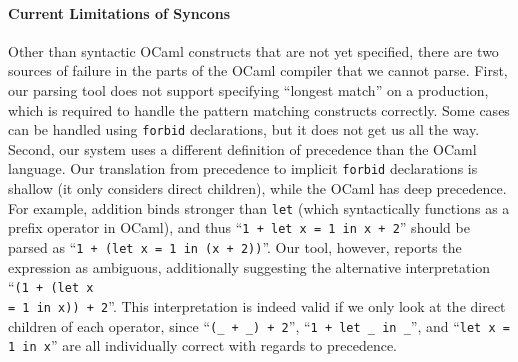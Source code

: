 \documentclass[runningheads]{llncs}
\newcommand{\ocaml}{\lstinline[language={[objective]caml}]}
\newcommand{\syncon}{\lstinline[language=syncon]}
\begin{document}
\paragraph{Current Limitations of Syncons}
%
Other than syntactic OCaml constructs that are not yet specified,
there are two sources of failure in the parts of the OCaml
compiler that we cannot parse.
%
First, our parsing tool does not support specifying ``longest
match'' on a production, which is required to handle the pattern
matching constructs correctly. Some cases can be handled using
\syncon{forbid} declarations, but it does not get us all the way.
%
Second, our system uses a different definition of precedence than
the OCaml language. Our translation from precedence to implicit
\syncon{forbid} declarations is shallow (it only considers direct
children), while the OCaml has deep precedence. For example,
addition binds stronger than \ocaml{let} (which syntactically
functions as a prefix operator in OCaml), and thus
%
``\ocaml{1 + let x = 1 in x + 2}'' should be parsed as
%
``\ocaml{1 + (let x = 1 in (x + 2))}''. Our tool, however, reports
the expression as ambiguous, additionally suggesting the
alternative interpretation
%
``\ocaml{(1 + (let x}\\\ocaml{= 1 in x)) + 2}''.
%
This interpretation is indeed valid if we only look at the direct
children of each operator, since ``\ocaml{(_ + _) + 2}'',
``\ocaml{1 + let _ in _}'', and ``\ocaml{let x = 1 in x}'' are all
individually correct with regards to precedence.


\end{document}
